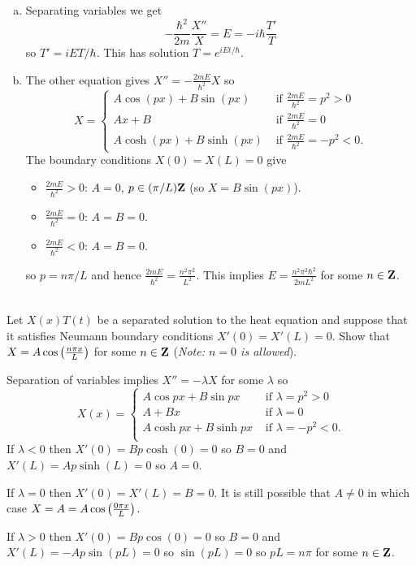 \documentclass[12pt]{article}
\begin{document}
\begin{answer}
\begin{enumerate}[(a)]
\item Separating variables we get
\[-\frac{\hbar^2}{2m}\frac{X''}{X}=E=-i\hbar\frac{T'}{T}\]
so $T'=iET/\hbar$. This has solution $T=e^{iEt/\hbar}$.
\item The other equation gives $X''=-\frac{2mE}{\hbar^2}X$ so
\[X=\begin{cases}
A\cos(px)+B\sin(px)&\mbox{ if }\frac{2mE}{\hbar^2}=p^2>0\\
Ax+B&\mbox{ if }\frac{2mE}{\hbar^2}=0\\
A\cosh(px)+B\sinh(px)&\mbox{ if }\frac{2mE}{\hbar^2}=-p^2<0.
\end{cases}\]
The boundary conditions $X(0)=X(L)=0$ give
\begin{itemize}
\item $\frac{2mE}{\hbar^2}>0$: $A=0$, $p\in(\pi/L)\mathbf{Z}$ (so $X=B\sin(px)$).
\item $\frac{2mE}{\hbar^2}=0$: $A=B=0$.
\item $\frac{2mE}{\hbar^2}<0$: $A=B=0$.
\end{itemize}
so $p=n\pi/L$ and hence $\frac{2mE}{\hbar^2}=\frac{n^2\pi^2}{L^2}$. This implies $E=\frac{n^2\pi^2\hbar^2}{2mL^2}$ for some $n\in\mathbf{Z}$.
\end{enumerate}
\end{answer}
\newpage

\bigskip

\begin{question}\ \\
Let $X(x)T(t)$ be a separated solution to the heat equation and suppose that it satisfies Neumann boundary conditions $X'(0)=X'(L)=0$. Show that $X=A\cos\left(\frac{n \pi x}{L}\right)$ for some $n\in\mathbf{Z}$ ({\em Note: $n=0$ is allowed}).
\end{question}

\begin{answer}
Separation of variables implies $X''=-\lambda X$ for some $\lambda$ so
\[
X(x)=\begin{cases}
A\cos px+B\sin px&\mbox{ if }\lambda=p^2>0\\
A+Bx &\mbox{ if }\lambda=0\\
A\cosh px+B\sinh px&\mbox{ if }\lambda=-p^2<0.\\
\end{cases}
\]
If $\lambda<0$ then $X'(0)=Bp\cosh(0)=0$ so $B=0$ and $X'(L)=Ap\sinh(L)=0$ so $A=0$.

If $\lambda=0$ then $X'(0)=X'(L)=B=0$. It is still possible that $A\neq 0$ in which case $X=A=A\cos\left(\frac{0 \pi x}{L}\right)$.

If $\lambda>0$ then $X'(0)=Bp\cos(0)=0$ so $B=0$ and $X'(L)=-Ap\sin(pL)=0$ so $\sin(pL)=0$ so $pL=n\pi$ for some $n\in\mathbf{Z}$.
\end{answer}
\end{document}

